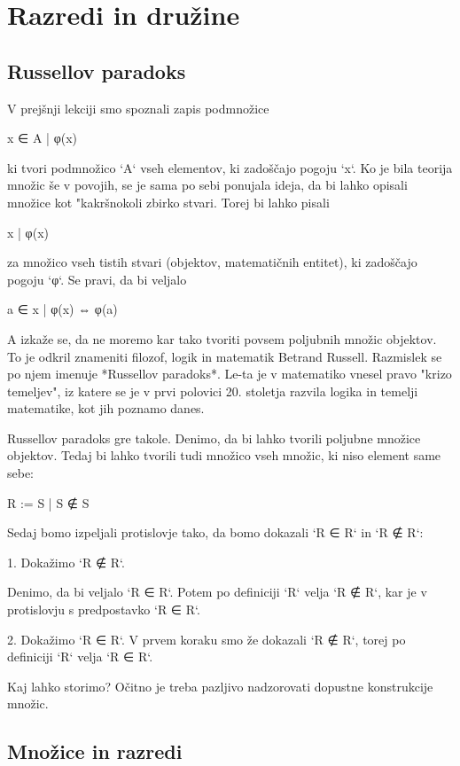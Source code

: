\chapter{Razredi in družine}

\section{Russellov paradoks}

V prejšnji lekciji smo spoznali zapis podmnožice

    { x ∈ A | φ(x) }

ki tvori podmnožico `A` vseh elementov, ki zadoščajo pogoju `x`. Ko je bila
teorija množic še v povojih, se je sama po sebi ponujala ideja, da bi lahko
opisali množice kot "kakršnokoli zbirko stvari. Torej bi lahko pisali

    { x | φ(x) }

za množico vseh tistih stvari (objektov, matematičnih entitet), ki zadoščajo
pogoju `φ`. Se pravi, da bi veljalo

    a ∈ { x | φ(x) } ⇔ φ(a)

A izkaže se, da ne moremo kar tako tvoriti povsem poljubnih množic objektov. To
je odkril znameniti filozof, logik in matematik Betrand Russell. Razmislek se po
njem imenuje *Russellov paradoks*. Le-ta je v matematiko vnesel pravo "krizo
temeljev", iz katere se je v prvi polovici 20. stoletja razvila logika in
temelji matematike, kot jih poznamo danes.

Russellov paradoks gre takole. Denimo, da bi lahko tvorili poljubne množice
objektov. Tedaj bi lahko tvorili tudi množico vseh množic, ki niso element same
sebe:

    R := { S | S ∉ S }

Sedaj bomo izpeljali protislovje tako, da bomo dokazali `R ∈ R` in `R ∉ R`:

1. Dokažimo `R ∉ R`.

   Denimo, da bi veljalo `R ∈ R`. Potem po definiciji `R` velja `R ∉ R`, kar
   je v protislovju s predpostavko `R ∈ R`.

2. Dokažimo `R ∈ R`. V prvem koraku smo že dokazali `R ∉ R`, torej po
   definiciji `R` velja `R ∈ R`.

Kaj lahko storimo? Očitno je treba pazljivo nadzorovati dopustne konstrukcije
množic.

\section{Množice in razredi}

